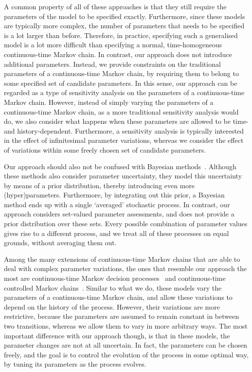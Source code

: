 \documentclass[10pt,a4paper]{paper}
\theoremstyle{definition}
\begin{document}
A common property of all of these approaches is that they still require the parameters of the model to be specified exactly. Furthermore, since these models are typically more complex, the number of parameters that needs to be specified is a lot larger than before. Therefore, in practice, specifying such a generalised model is a lot more difficult than specifying a normal, time-homogeneous continuous-time Markov chain.
In contrast, our approach does not introduce additional parameters. Instead, we provide constraints on the traditional parameters of a continuous-time Markov chain, by requiring them to belong to some specified set of candidate parameters.
In this sense, our approach can be regarded as a type of sensitivity analysis on the parameters of a continuous-time Markov chain. However, instead of simply varying the parameters of a continuous-time Markov chain, as a more traditional sensitivity analysis would do, we also consider what happens when these parameters are allowed to be time- and history-dependent. Furthermore, a sensitivity analysis is typically interested in the effect of infinitesimal parameter variations, whereas we consider the effect of variations within some freely chosen set of candidate parameters.

Our approach should also not be confused with Bayesian methods~\cite{insua2012bayesian}. Although these methods also consider parameter uncertainty, they model this uncertainty by means of a prior distribution, thereby introducing even more (hyper)parameters. Furthermore, by integrating out this prior, a Bayesian method ends up with a single `averaged' stochastic process. In contrast, our approach considers set-valued parameter assessments, and does not provide a prior distribution over these sets. Every possible combination of parameter values gives rise to a different process, and we treat all of these processes on equal grounds, without averaging them out.

Among the many extensions of continuous-time Markov chains that are able to deal with complex parameter variations, the ones that resemble our approach the most are continuous-time Markov decision processes~\cite{Xianping:2009} and continuous-time controlled Markov chains~\cite{guo2003}. Similar to what we do, these models vary the parameters of a continuous-time Markov chain, and allow these variations to depend on the history of the process. However, their variations are more restrictive, because the parameters are assumed to remain constant in between two transitions, whereas we allow them to vary in more arbitrary ways. The most important difference with our approach though, is that in these models, the parameter changes are not at all uncertain. In fact, the parameters can be chosen freely, and the goal is to control the evolution of the process in some optimal way, by tuning its parameters as the process evolves.
\end{document}
